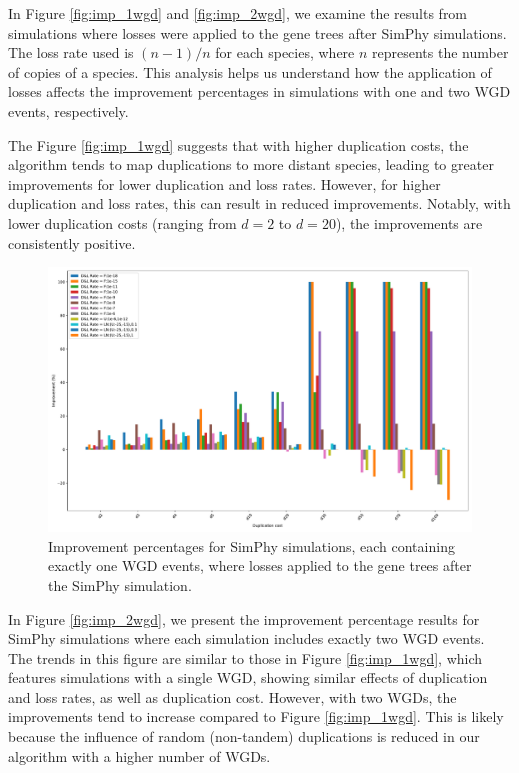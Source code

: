 \documentclass[10pt]{article}
\begin{document}
In Figure \ref{fig:imp_1wgd} and \ref{fig:imp_2wgd}, we examine the results from simulations where losses were applied to the gene trees after SimPhy simulations. The loss rate used is $(n-1)/n$ for each species, where $n$ represents the number of copies of a species. This analysis helps us understand how the application of losses affects the improvement percentages in simulations with one and two WGD events, respectively.

The Figure \ref{fig:imp_1wgd} suggests that with higher duplication costs, the algorithm tends to map duplications to more distant species, leading to greater improvements for lower duplication and loss rates. However, for higher duplication and loss rates, this can result in reduced improvements. Notably, with lower duplication costs (ranging from $d=2$ to $d=20$), the improvements are consistently positive.


\begin{figure}[hbt!]
    \centering
    \includegraphics[width=1\textwidth]{figs/imp_1WGD.pdf}
    \caption{Improvement percentages for SimPhy simulations, each containing exactly one WGD events, where losses applied to the gene trees after the SimPhy simulation.}
    \label{fig:imp_1wgd_old}
\end{figure}

In Figure \ref{fig:imp_2wgd}, we present the improvement percentage results for SimPhy simulations where each simulation includes exactly two WGD events. The trends in this figure are similar to those in Figure \ref{fig:imp_1wgd}, which features simulations with a single WGD, showing similar effects of duplication and loss rates, as well as duplication cost. However, with two WGDs, the improvements tend to increase compared to Figure \ref{fig:imp_1wgd}. This is likely because the influence of random (non-tandem) duplications is reduced in our algorithm with a higher number of WGDs.
\end{document}
